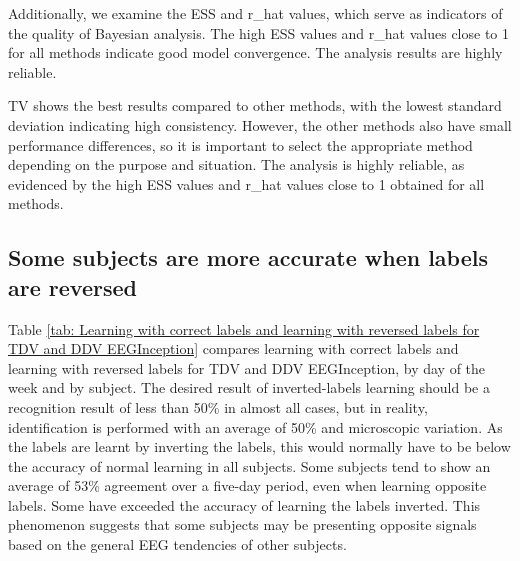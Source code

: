      Additionally, we examine the ESS and r\_hat values, which serve as indicators of the quality of Bayesian analysis. The high ESS values and r\_hat values close to 1 for all methods indicate good model convergence. The analysis results are highly reliable.

    TV shows the best results compared to other methods, with the lowest standard deviation indicating high consistency. However, the other methods also have small performance differences, so it is important to select the appropriate method depending on the purpose and situation. The analysis is highly reliable, as evidenced by the high ESS values and r\_hat values close to 1 obtained for all methods.
    \subsection{Some subjects are more accurate when labels are reversed}
    Table \ref{tab: Learning with correct labels and learning with reversed labels for TDV and DDV EEGInception} compares learning with correct labels and learning with reversed labels for TDV and DDV EEGInception, by day of the week and by subject. The desired result of inverted-labels learning should be a recognition result of less than 50\% in almost all cases, but in reality, identification is performed with an average of 50\% and microscopic variation. As the labels are learnt by inverting the labels, this would normally have to be below the accuracy of normal learning in all subjects. Some subjects tend to show an average of 53\% agreement over a five-day period, even when learning opposite labels. Some have exceeded the accuracy of learning the labels inverted. This phenomenon suggests that some subjects may be presenting opposite signals based on the general EEG tendencies of other subjects.